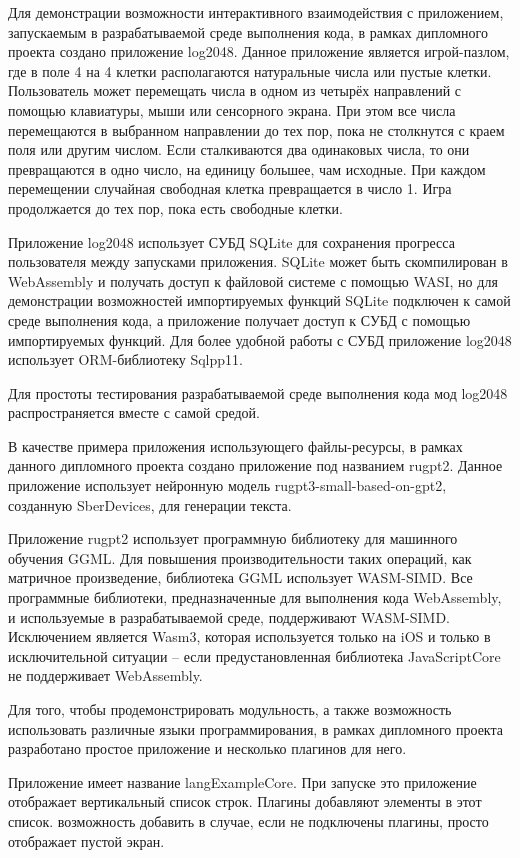 Для демонстрации возможности интерактивного взаимодействия с приложением, запускаемым в разрабатываемой среде выполнения кода, в рамках дипломного проекта создано приложение log2048.
Данное приложение является игрой-пазлом, где в поле 4 на 4 клетки располагаются натуральные числа или пустые клетки.
Пользователь может перемещать числа в одном из четырёх направлений с помощью клавиатуры, мыши или сенсорного экрана.
При этом все числа перемещаются в выбранном направлении до тех пор, пока не столкнутся с краем поля или другим числом. 
Если сталкиваются два одинаковых числа, то они превращаются в одно число, на единицу большее, чам исходные.
При каждом перемещении случайная свободная клетка превращается в число 1.
Игра продолжается до тех пор, пока есть свободные клетки.

Приложение log2048 использует СУБД SQLite для сохранения прогресса пользователя между запусками приложения.
SQLite может быть скомпилирован в WebAssembly и получать доступ к файловой системе с помощью WASI, но для демонстрации возможностей импортируемых функций SQLite подключен к самой среде выполнения кода, а приложение получает доступ к СУБД с помощью импортируемых функций.
Для более удобной работы с СУБД приложение log2048 использует ORM-библиотеку Sqlpp11.

Для простоты тестирования разрабатываемой среде выполнения кода мод log2048 распространяется вместе с самой средой.

В качестве примера приложения использующего файлы-ресурсы, в рамках данного дипломного проекта создано приложение под названием rugpt2.
Данное приложение использует нейронную модель rugpt3-small-based-on-gpt2, созданную SberDevices, для генерации текста.

Приложение rugpt2 использует программную библиотеку для машинного обучения GGML.
Для повышения производительности таких операций, как матричное произведение, библиотека GGML использует WASM-SIMD.
Все программные библиотеки, предназначенные для выполнения кода WebAssembly, и используемые в разрабатываемой среде, поддерживают WASM-SIMD.
Исключением является Wasm3, которая используется только на iOS и только в исключительной ситуации -- если предустановленная библиотека JavaScriptCore не поддерживает WebAssembly.

Для того, чтобы продемонстрировать модульность, а также возможность использовать различные языки программирования, в рамках дипломного проекта разработано простое приложение и несколько плагинов для него.

Приложение имеет название langExampleCore.
При запуске это приложение отображает вертикальный список строк.
Плагины добавляют элементы в этот список. возможность добавить в случае, если не подключены плагины, просто отображает пустой экран.
